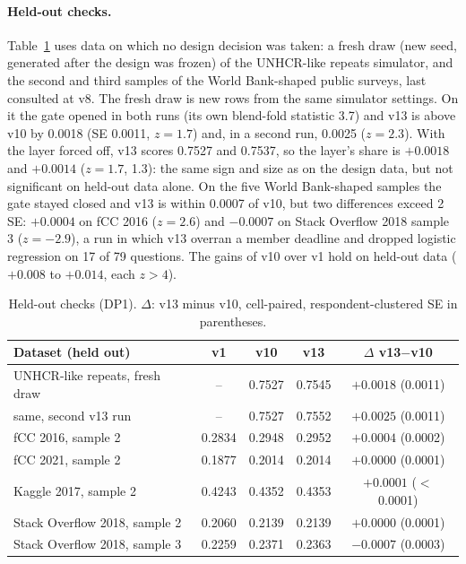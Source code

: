 \documentclass{article}
\begin{document}
\paragraph{Held-out checks.} Table~\ref{tab:heldout} uses data on which no design decision was taken: a fresh draw (new seed, generated after the design was frozen) of the UNHCR-like repeats simulator, and the second and third samples of the World Bank-shaped public surveys, last consulted at v8. The fresh draw is new rows from the same simulator settings. On it the gate opened in both runs (its own blend-fold statistic 3.7) and v13 is above v10 by 0.0018 (SE 0.0011, $z=1.7$) and, in a second run, 0.0025 ($z=2.3$). With the layer forced off, v13 scores 0.7527 and 0.7537, so the layer's share is $+0.0018$ and $+0.0014$ ($z=1.7$, 1.3): the same sign and size as on the design data, but not significant on held-out data alone. On the five World Bank-shaped samples the gate stayed closed and v13 is within 0.0007 of v10, but two differences exceed 2 SE: $+0.0004$ on fCC 2016 ($z=2.6$) and $-0.0007$ on Stack Overflow 2018 sample 3 ($z=-2.9$), a run in which v13 overran a member deadline and dropped logistic regression on 17 of 79 questions. The gains of v10 over v1 hold on held-out data ($+0.008$ to $+0.014$, each $z>4$).

\begin{table}[h]
  \centering
  \small
  \caption{Held-out checks (DP1). $\Delta$: v13 minus v10, cell-paired, respondent-clustered SE in parentheses.}
  \label{tab:heldout}
  \begin{tabular}{lcccc}
    \toprule
    Dataset (held out) & v1 & v10 & v13 & $\Delta$ v13$-$v10 \\
    \midrule
    UNHCR-like repeats, fresh draw & -- & 0.7527 & 0.7545 & $+0.0018$ (0.0011) \\
    \quad same, second v13 run & -- & 0.7527 & 0.7552 & $+0.0025$ (0.0011) \\
    fCC 2016, sample 2 & 0.2834 & 0.2948 & 0.2952 & $+0.0004$ (0.0002) \\
    fCC 2021, sample 2 & 0.1877 & 0.2014 & 0.2014 & $+0.0000$ (0.0001) \\
    Kaggle 2017, sample 2 & 0.4243 & 0.4352 & 0.4353 & $+0.0001$ ($<$0.0001) \\
    Stack Overflow 2018, sample 2 & 0.2060 & 0.2139 & 0.2139 & $+0.0000$ (0.0001) \\
    Stack Overflow 2018, sample 3 & 0.2259 & 0.2371 & 0.2363 & $-0.0007$ (0.0003) \\
    \bottomrule
  \end{tabular}
\end{table}
\end{document}
